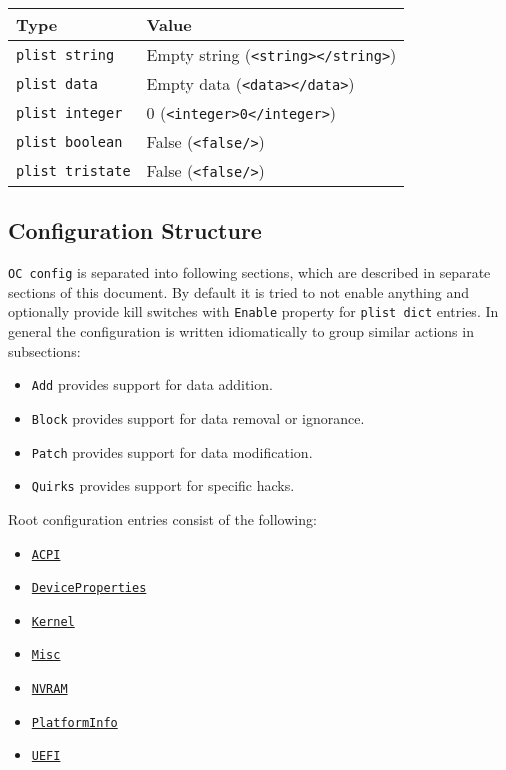 \documentclass[]{article}
\providecommand{\tightlist}{%
  \setlength{\itemsep}{0pt}\setlength{\parskip}{0pt}}
\begin{document}
\begin{longtable}[]{@{}ll@{}}
\toprule
Type & Value\tabularnewline
\midrule
\endhead
\texttt{plist\ string} & Empty string
(\texttt{\textless{}string\textgreater{}\textless{}/string\textgreater{}})\tabularnewline
\texttt{plist\ data} & Empty data
(\texttt{\textless{}data\textgreater{}\textless{}/data\textgreater{}})\tabularnewline
\texttt{plist\ integer} & 0
(\texttt{\textless{}integer\textgreater{}0\textless{}/integer\textgreater{}})\tabularnewline
\texttt{plist\ boolean} & False
(\texttt{\textless{}false/\textgreater{}})\tabularnewline
\texttt{plist\ tristate} & False
(\texttt{\textless{}false/\textgreater{}})\tabularnewline
\bottomrule
\end{longtable}

\subsection{Configuration Structure}\label{configuration-structure}

\texttt{OC\ config} is separated into following sections, which are described
in separate sections of this document. By default it is tried to not enable
anything and optionally provide kill switches with \texttt{Enable} property
for \texttt{plist dict} entries. In general the configuration is written
idiomatically to group similar actions in subsections:

\begin{itemize}
\tightlist
\item
  \texttt{Add} provides support for data addition.
\item
  \texttt{Block} provides support for data removal or ignorance.
\item
  \texttt{Patch} provides support for data modification.
\item
  \texttt{Quirks} provides support for specific hacks.
\end{itemize}

Root configuration entries consist of the following:

\begin{itemize}
\tightlist
\item
  \hyperref[acpi]{\texttt{ACPI}}
\item
  \hyperref[devprops]{\texttt{DeviceProperties}}
\item
  \hyperref[kernel]{\texttt{Kernel}}
\item
  \hyperref[misc]{\texttt{Misc}}
\item
  \hyperref[nvram]{\texttt{NVRAM}}
\item
  \hyperref[platforminfo]{\texttt{PlatformInfo}}
\item
  \hyperref[uefi]{\texttt{UEFI}}
\end{itemize}
\end{document}
